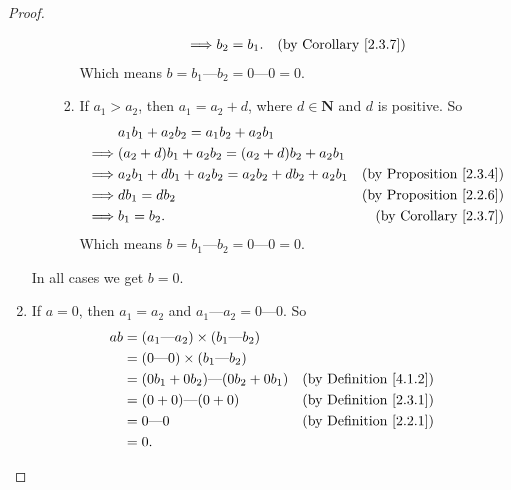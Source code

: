 \begin{proof}
\begin{enumerate}
\begin{enumerate}[label=(\roman*)]
\begin{enumerate}[label=(\arabic*)]
\begin{align*}
                                      \implies & b_2 = b_1.                                      & \text{(by Corollary \ref{2.3.7})}
                                  \end{align*}
                                  Which means \(b = b_1 \text{---} b_2 = 0 \text{---} 0 = 0\).
                            \item If \(a_1 > a_2\), then \(a_1 = a_2 + d\), where \(d \in \mathbf{N}\) and \(d\) is positive.
                                  So
                                  \begin{align*}
                                               & a_1b_1 + a_2b_2 = a_1b_2 + a_2b_1                                                     \\
                                      \implies & (a_2 + d)b_1 + a_2b_2 = (a_2 + d)b_2 + a_2b_1                                         \\
                                      \implies & a_2b_1 + db_1 + a_2b_2 = a_2b_2 + db_2 + a_2b_1 & \text{(by Proposition \ref{2.3.4})} \\
                                      \implies & db_1 = db_2                                     & \text{(by Proposition \ref{2.2.6})} \\
                                      \implies & b_1 = b_2.                                      & \text{(by Corollary \ref{2.3.7})}
                                  \end{align*}
                                  Which means \(b = b_1 \text{---} b_2 = 0 \text{---} 0 = 0\).
                        \end{enumerate}
              \end{enumerate}
              In all cases we get \(b = 0\).
        \item If \(a = 0\), then \(a_1 = a_2\) and \(a_1 \text{---} a_2 = 0 \text{---} 0\).
              So
              \begin{align*}
                  ab & = (a_1 \text{---} a_2) \times (b_1 \text{---} b_2)                                      \\
                     & = (0 \text{---} 0) \times (b_1 \text{---} b_2)                                          \\
                     & = (0b_1 + 0b_2) \text{---} (0b_2 + 0b_1)           & \text{(by Definition \ref{4.1.2})} \\
                     & = (0 + 0) \text{---} (0 + 0)                       & \text{(by Definition \ref{2.3.1})} \\
                     & = 0 \text{---} 0                                   & \text{(by Definition \ref{2.2.1})} \\
                     & = 0.
              \end{align*}
    \end{enumerate}
\end{proof}

